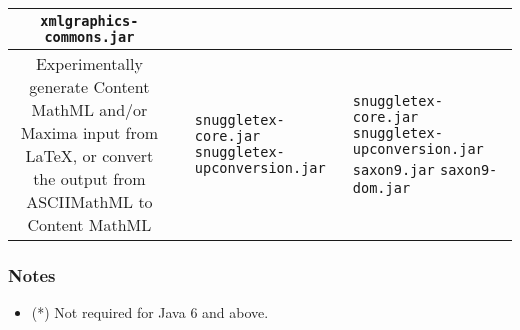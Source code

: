 \begin{tabular}{|c|c|l|l|}
\verb|xmlgraphics-commons.jar| \\
\hline
Experimentally generate Content MathML and/or Maxima input\newline
from LaTeX, or convert the output from ASCIIMathML to Content MathML &
\href[\verb|snuggletex-1.2.n-full.zip|]{http://sourceforge.net/project/showfiles.php?group_id=221375} &
\verb|snuggletex-core.jar|\newline
\verb|snuggletex-upconversion.jar| &
\verb|snuggletex-core.jar|\newline
\verb|snuggletex-upconversion.jar|\newline
\verb|saxon9.jar|\newline
\verb|saxon9-dom.jar| \\
\hline
\end{tabular}

\subsubsection*{Notes}
\begin{itemize}
  \item (*) Not required for Java 6 and above.
\end{itemize}
